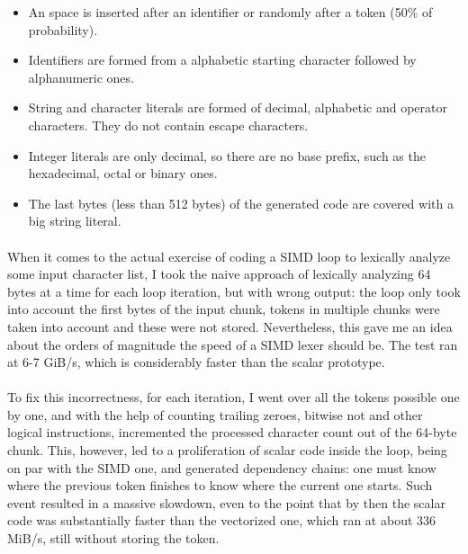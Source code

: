 \documentclass[12pt]{article}
\begin{document}
	\begin{itemize}
		\item An space is inserted after an identifier or randomly after a token (50\% of probability).
		\item Identifiers are formed from a alphabetic starting character followed by alphanumeric ones.
		\item String and character literals are formed of decimal, alphabetic and operator characters. They do not contain escape characters.
		\item Integer literals are only decimal, so there are no base prefix, such as the hexadecimal, octal or binary ones.
		\item The last bytes (less than 512 bytes) of the generated code are covered with a big string literal.
	\end{itemize}

	\paragraph{}
	When it comes to the actual exercise of coding a SIMD loop to lexically analyze some input character list, I took the naive approach of lexically analyzing 64 bytes at a time for each loop iteration, but with wrong output: the loop only took into account the first bytes of the input chunk, tokens in multiple chunks were taken into account and these were not stored. Nevertheless, this gave me an idea about the orders of magnitude the speed of a SIMD lexer should be. The test ran at 6-7 GiB/s, which is considerably faster than the scalar prototype.
	
	\paragraph{}
	To fix this incorrectness, for each iteration, I went over all the tokens possible one by one, and with the help of counting trailing zeroes, bitwise not and other logical instructions, incremented the processed character count out of the 64-byte chunk. This, however, led to a proliferation of scalar code inside the loop, being on par with the SIMD one, and generated dependency chains: one must know where the previous token finishes to know where the current one starts. Such event resulted in a massive slowdown, even to the point that by then the scalar code was substantially faster than the vectorized one, which ran at about 336 MiB/s, still without storing the token.
	
\end{document}
